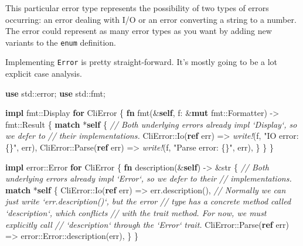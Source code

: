 \documentclass[a4paper,]{book}
\newenvironment{Shaded}{\begin{snugshade}}{\end{snugshade}}
\newcommand{\KeywordTok}[1]{\textcolor[rgb]{0.13,0.29,0.53}{\textbf{{#1}}}}
\newcommand{\DataTypeTok}[1]{\textcolor[rgb]{0.13,0.29,0.53}{{#1}}}
\newcommand{\StringTok}[1]{\textcolor[rgb]{0.31,0.60,0.02}{{#1}}}
\newcommand{\CommentTok}[1]{\textcolor[rgb]{0.56,0.35,0.01}{\textit{{#1}}}}
\newcommand{\BuiltInTok}[1]{{#1}}
\newcommand{\PreprocessorTok}[1]{\textcolor[rgb]{0.56,0.35,0.01}{\textit{{#1}}}}
\newcommand{\NormalTok}[1]{{#1}}
\begin{document}
This particular error type represents the possibility of two types of
errors occurring: an error dealing with I/O or an error converting a
string to a number. The error could represent as many error types as you
want by adding new variants to the \texttt{enum} definition.

Implementing \texttt{Error} is pretty straight-forward. It's mostly
going to be a lot explicit case analysis.

\begin{Shaded}
\begin{Highlighting}[]
\KeywordTok{use} \NormalTok{std::error;}
\KeywordTok{use} \NormalTok{std::fmt;}

\KeywordTok{impl} \NormalTok{fmt::}\BuiltInTok{Display} \KeywordTok{for} \NormalTok{CliError \{}
    \KeywordTok{fn} \NormalTok{fmt(&}\KeywordTok{self}\NormalTok{, f: &}\KeywordTok{mut} \NormalTok{fmt::Formatter) -> fmt::}\DataTypeTok{Result} \NormalTok{\{}
        \KeywordTok{match} \NormalTok{*}\KeywordTok{self} \NormalTok{\{}
            \CommentTok{// Both underlying errors already impl `Display`, so we defer to}
            \CommentTok{// their implementations.}
            \NormalTok{CliError::Io(}\KeywordTok{ref} \NormalTok{err) => }\PreprocessorTok{write!}\NormalTok{(f, }\StringTok{"IO error: \{\}"}\NormalTok{, err),}
            \NormalTok{CliError::Parse(}\KeywordTok{ref} \NormalTok{err) => }\PreprocessorTok{write!}\NormalTok{(f, }\StringTok{"Parse error: \{\}"}\NormalTok{, err),}
        \NormalTok{\}}
    \NormalTok{\}}
\NormalTok{\}}

\KeywordTok{impl} \NormalTok{error::Error }\KeywordTok{for} \NormalTok{CliError \{}
    \KeywordTok{fn} \NormalTok{description(&}\KeywordTok{self}\NormalTok{) -> &}\DataTypeTok{str} \NormalTok{\{}
        \CommentTok{// Both underlying errors already impl `Error`, so we defer to their}
        \CommentTok{// implementations.}
        \KeywordTok{match} \NormalTok{*}\KeywordTok{self} \NormalTok{\{}
            \NormalTok{CliError::Io(}\KeywordTok{ref} \NormalTok{err) => err.description(),}
            \CommentTok{// Normally we can just write `err.description()`, but the error}
            \CommentTok{// type has a concrete method called `description`, which conflicts}
            \CommentTok{// with the trait method. For now, we must explicitly call}
            \CommentTok{// `description` through the `Error` trait.}
            \NormalTok{CliError::Parse(}\KeywordTok{ref} \NormalTok{err) => error::Error::description(err),}
        \NormalTok{\}}
    \NormalTok{\}}


\end{Highlighting}
\end{Shaded}
\end{document}
